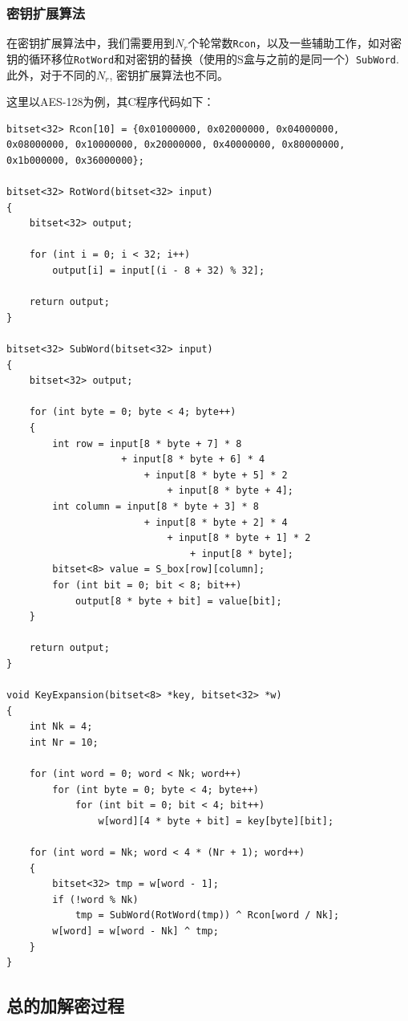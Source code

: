 \subsubsection{密钥扩展算法}
在密钥扩展算法中，我们需要用到$N_r$个轮常数\verb`Rcon`，以及一些辅助工作，如对密钥的循环移位\verb`RotWord`和对密钥的替换（使用的S盒与之前的是同一个）\verb`SubWord`. 此外，对于不同的$N_r$, 密钥扩展算法也不同。\par
这里以AES-128为例，其C程序代码如下：
\begin{prove}
\begin{verbatim}
bitset<32> Rcon[10] = {0x01000000, 0x02000000, 0x04000000,
0x08000000, 0x10000000, 0x20000000, 0x40000000, 0x80000000,
0x1b000000, 0x36000000};

bitset<32> RotWord(bitset<32> input)
{
    bitset<32> output;

    for (int i = 0; i < 32; i++)
        output[i] = input[(i - 8 + 32) % 32];

    return output;
}

bitset<32> SubWord(bitset<32> input)
{
    bitset<32> output;
    
    for (int byte = 0; byte < 4; byte++)
    {
        int row = input[8 * byte + 7] * 8
                    + input[8 * byte + 6] * 4
                        + input[8 * byte + 5] * 2
                            + input[8 * byte + 4];
        int column = input[8 * byte + 3] * 8
                        + input[8 * byte + 2] * 4
                            + input[8 * byte + 1] * 2
                                + input[8 * byte];
        bitset<8> value = S_box[row][column];
        for (int bit = 0; bit < 8; bit++)
            output[8 * byte + bit] = value[bit];
    }
    
    return output;
}

void KeyExpansion(bitset<8> *key, bitset<32> *w)
{
    int Nk = 4;
    int Nr = 10;
    
    for (int word = 0; word < Nk; word++)
        for (int byte = 0; byte < 4; byte++)
            for (int bit = 0; bit < 4; bit++)
                w[word][4 * byte + bit] = key[byte][bit];

    for (int word = Nk; word < 4 * (Nr + 1); word++)
    {
        bitset<32> tmp = w[word - 1];
        if (!word % Nk)
            tmp = SubWord(RotWord(tmp)) ^ Rcon[word / Nk];
        w[word] = w[word - Nk] ^ tmp;
    }
}
\end{verbatim}
\end{prove}
\subsection{总的加解密过程}
